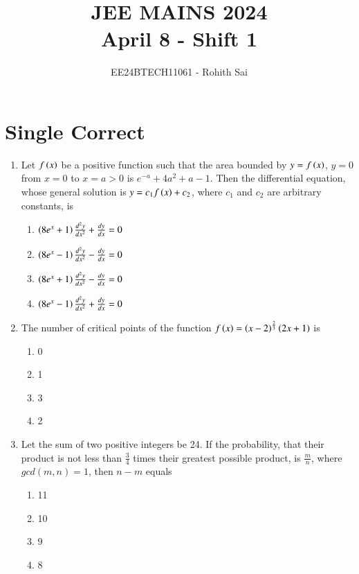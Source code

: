 \documentclass[journal]{IEEEtran}
\begin{document}

\vspace{3cm}

\title{JEE MAINS 2024\\April 8 - Shift 1}
\author{EE24BTECH11061 - Rohith Sai}
\maketitle

\renewcommand{\thefigure}{\theenumi}
\renewcommand{\thetable}{\theenumi}

\section*{Single Correct}
\begin{enumerate}
\item Let $f\left(x\right)$ be a positive function such that the area bounded by $y=f\left(x\right)$, $y=0$ from $x=0$ to $x=a>0$ is $e^{-a}+4a^2+a-1$. Then the differential equation, whose general solution is $y=c_1f\left(x\right) + c_2$, where $c_1$ and $c_2$ are arbitrary constants, is
\begin{multicols}{2}
    \begin{enumerate}
        \item $\left(8e^x+1\right)\frac{d^2y}{dx^2} + \frac{dy}{dx} = 0$
        \item $\left(8e^x-1\right)\frac{d^2y}{dx^2} - \frac{dy}{dx} = 0$
        \item $\left(8e^x+1\right)\frac{d^2y}{dx^2} - \frac{dy}{dx} = 0$
        \item $\left(8e^x-1\right)\frac{d^2y}{dx^2} + \frac{dy}{dx} = 0$
    \end{enumerate}
\end{multicols}

\item The number of critical points of the function $f\left(x\right) = \left(x-2\right)^{\frac{2}{3}}\left(2x+1\right)$ is
\begin{multicols}{2}
    \begin{enumerate}
        \item 0
        \item 1
        \item 3
        \item 2
    \end{enumerate}
\end{multicols}

\item Let the sum of two positive integers be 24. If the probability, that their product is not less than $\frac{3}{4}$ times their greatest possible product, is $\frac{m}{n}$, where $gcd(m,n) = 1$, then $n-m$ equals
\begin{multicols}{2}
    \begin{enumerate}
        \item 11
        \item 10
        \item 9
        \item 8
    \end{enumerate}
\end{multicols}


\end{enumerate}
\end{document}
